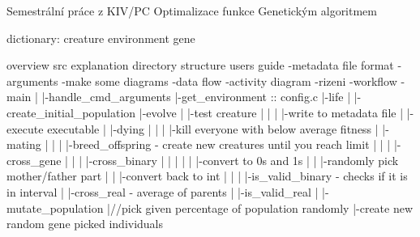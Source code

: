 \documentclass{article}
\begin{document}
  
  Semestrální práce z KIV/PC
  Optimalizace funkce Genetickým algoritmem
  
  dictionary:
  	creature
  	environment
  	gene
  
  overview
  src explanation
  directory structure
  users guide
  -metadata file format
  -arguments
  -make
  some diagrams
  -data flow
  -activity diagram
  -rizeni
  -workflow
  -main
  |
  |-handle_cmd_arguments
  |-get_environment  ::  config.c
  |-life
    |
    |-create_initial_population
    |-evolve
      |
      |-test creature
      | |
      | |-write to metadata file
      | |-execute executable
      |
      |-dying
      | |
      | |-kill everyone with below average fitness
      |  
      |-mating
      | |
      | |-breed_offspring - create new creatures until you reach limit
      |   |
      |   |-cross_gene
      |     |
      |     |-cross_binary
      |     | |
      |     | |-convert to 0s and 1s
      |     | |-randomly pick mother/father part
      |     | |-convert back to int
      |     |
      |     |-is_valid_binary - checks if it is in interval
      |     |-cross_real - average of parents
      |     |-is_valid_real
      |
      |-mutate_population
        |//pick given percentage of population randomly
        |-create new random gene picked individuals
  
    
\end{document}
